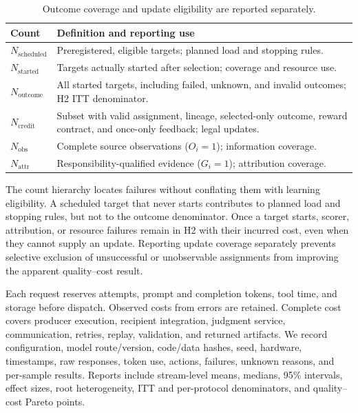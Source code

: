 \documentclass[sigconf,anonymous]{aamas}
\begin{document}
\begin{table}[t]
\centering\small
\begin{tabular}{@{}p{}p{}@{}}
\toprule
Count & Definition and reporting use \\
\midrule
$N_{\mathrm{scheduled}}$ & Preregistered, eligible targets; planned load and stopping rules. \\
$N_{\mathrm{started}}$ & Targets actually started after selection; coverage and resource use. \\
$N_{\mathrm{outcome}}$ & All started targets, including failed, unknown, and invalid outcomes; H2 ITT denominator. \\
$N_{\mathrm{credit}}$ & Subset with valid assignment, lineage, selected-only outcome, reward contract, and once-only feedback; legal updates. \\
$N_{\mathrm{obs}}$ & Complete source observations ($O_i=1$); information coverage. \\
$N_{\mathrm{attr}}$ & Responsibility-qualified evidence ($G_i=1$); attribution coverage. \\
\bottomrule
\end{tabular}
\caption{Outcome coverage and update eligibility are reported separately.}
\label{tab:denominators}
\end{table}

The count hierarchy locates failures without conflating them with learning eligibility. A scheduled target that never starts contributes to planned load and stopping rules, but not to the outcome denominator. Once a target starts, scorer, attribution, or resource failures remain in H2 with their incurred cost, even when they cannot supply an update. Reporting update coverage separately prevents selective exclusion of unsuccessful or unobservable assignments from improving the apparent quality--cost result.

Each request reserves attempts, prompt and completion tokens, tool time, and storage before dispatch. Observed costs from errors are retained. Complete cost covers producer execution, recipient integration, judgment service, communication, retries, replay, validation, and returned artifacts. We record configuration, model route/version, code/data hashes, seed, hardware, timestamps, raw responses, token use, actions, failures, unknown reasons, and per-sample results. Reports include stream-level means, medians, 95\% intervals, effect sizes, root heterogeneity, ITT and per-protocol denominators, and quality--cost Pareto points.
\end{document}

